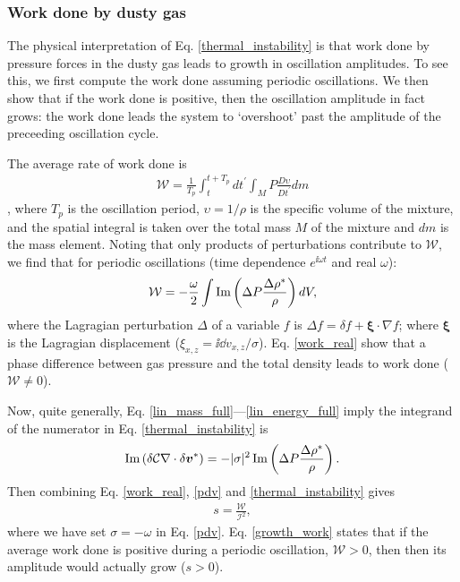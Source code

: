 

\subsubsection{Work done by dusty gas} 

The physical interpretation of Eq. \ref{thermal_instability} is that 
work done by pressure forces in the dusty gas leads to growth in
oscillation amplitudes. To see this, we first compute the work done
assuming periodic oscillations. We then show that if the work done is positive, then the
oscillation amplitude in fact grows: the work done leads the
system to `overshoot' past the amplitude of the preceeding oscillation
cycle. 


The average rate of work done is 
\begin{align}
  \mathcal{W} = \frac{1}{T_p}\int^{t+T_p}_{t}dt^\prime\int_M P
  \frac{D\upsilon}{Dt^\prime} dm \label{work_def} 
\end{align}
\citep{cox67}, 
where $T_p$ is the oscillation period, $\upsilon=1/\rho$ is the specific
volume of the mixture, and the spatial integral is taken over the
total mass $M$ of the mixture and $dm$ is the mass element. 
Noting that only products of perturbations contribute to
$\mathcal{W}$, we find that for periodic oscillations (time dependence 
$e^{\ii\omega t}$ and real $\omega$): 
\begin{align}
  \mathcal{W} = - \frac{\omega}{2} \int \operatorname{Im}\left(\Delta P
  \frac{\Delta \rho^*}{\rho}\right)dV,\label{work_real}
\end{align}
where %
 the Lagragian perturbation $\Delta$ of a variable $f$ is 
$\Delta f = \delta f + \bm{\xi}\cdot\nabla f$; where $\bm{\xi}$ is the
Lagragian displacement ($    \xi_{x,z} =  \ii \dd v_{x,z}/\sigma$).  
Eq. \ref{work_real} show that a phase difference between gas pressure and
the total density leads to work done
($\mathcal{W}\neq0$).  

Now, quite generally, Eq. \ref{lin_mass_full}---\ref{lin_energy_full} 
imply the integrand of the numerator in Eq. \ref{thermal_instability} 
is 
\begin{align} 
  \operatorname{Im} \left(\delta \mathcal{C}
  \nabla\cdot\delta \bm{v}^*\right) = 
  -|\sigma|^2\operatorname{Im} \left(\Delta P 
  \frac{\Delta\rho^*}{\rho}\right). \label{pdv}
\end{align}
Then combining Eq. \ref{work_real}, \ref{pdv} and
\ref{thermal_instability} 
gives  
\begin{align}
s = \frac{\mathcal{W}}{\mathcal{I}^2}, \label{growth_work}
\end{align}
where we have set $\sigma= - \omega$ in 
Eq. \ref{pdv}. Eq. \ref{growth_work} states that if the average work
done is positive during a periodic oscillation, $\mathcal{W}>0$, then
then its amplitude would actually grow ($s>0$).  %

